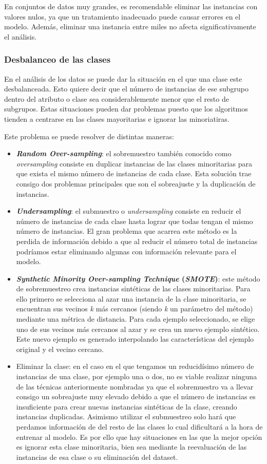 En conjuntos de datos muy grandes, es recomendable eliminar las instancias con valores nulos, ya que un tratamiento inadecuado puede causar errores en el modelo. Además, eliminar una instancia entre miles no afecta significativamente el análisis.

\subsubsection{Desbalanceo de las clases}

En el análisis de los datos se puede dar la situación en el que una clase este desbalanceada. Esto quiere decir que el número de instancias de ese subgrupo dentro del atributo o clase sea considerablemente menor que el resto de subgrupos. Estas situaciones pueden dar problemas puesto que los algoritmos tienden a centrarse en las clases mayoritarias e ignorar las minoriatiras.

Este problema se puede resolver de distintas maneras:
\begin{itemize}
\item \textbf{\textit{Random Over-sampling}}: el sobremuestro también conocido como \textit{oversampling} consiste en duplicar instancias de las clases minoritarias para que exista el mismo número de instancias de cada clase. Esta solución trae consigo dos problemas principales que son el sobreajuste y la duplicación de instancias.
\item \textbf{\textit{Undersampling}}: el submuestro o \textit{undersampling} consiste en reducir el número de instancias de cada clase hasta lograr que todas tengan el mismo número de instancias. El gran problema que acarrea este método es la perdida de información debido a que al reducir el número total de instancias podríamos estar eliminando algunas con información relevante para el modelo.
\item \textbf{\textit{Synthetic Minority Over-sampling Technique} (\textit{SMOTE})}:
este método de sobremuestreo crea instancias sintéticas de las clases minoritarias. Para ello primero se selecciona al azar una instancia de la clase minoritaria, se encuentran sus vecinos \textit{k} más cercanos (siendo \textit{k} un parámetro del método) mediante una métrica de distancia. Para cada ejemplo seleccionado, se elige uno de sus vecinos más cercanos al azar y se crea un nuevo ejemplo sintético. Este nuevo ejemplo es generado interpolando las características del ejemplo original y el vecino cercano.
\item Eliminar la clase: en el caso en el que tengamos un reducidísimo número de instancias de una clase, por ejemplo una o dos, no es viable realizar ninguna de las técnicas anteriormente nombradas ya que el sobremuestro va a llevar consigo un sobreajuste muy elevado debido a que el número de instancias es insuficiente para crear nuevas instancias sintéticas de la clase, creando instancias duplicadas. Asimismo utilizar el submuestreo solo hará que perdamos información de del resto de las clases lo cual dificultará a la hora de entrenar al modelo. Es por ello que hay situaciones en las que la mejor opción es ignorar esta clase minoritaria, bien sea mediante la reevaluación de las instancias de esa clase o su eliminación del dataset.
\end{itemize}


